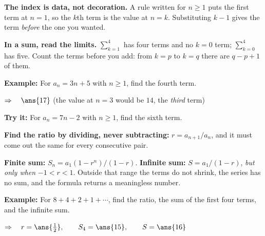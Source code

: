 \documentclass[12pt]{article}
\begin{document}


\begin{formulabox}
\textbf{The index is data, not decoration.} A rule written for $n \ge 1$ puts the first term
at $n = 1$, so the $k$th term is the value at $n = k$. Substituting $k - 1$ gives the term
\emph{before} the one you wanted.\par
\textbf{In a sum, read the limits.} $\sum_{k=1}^{4}$ has four terms and no $k = 0$ term;
$\sum_{k=0}^{4}$ has five. Count the terms before you add: from $k = p$ to $k = q$ there are
$q - p + 1$ of them.
\end{formulabox}

\begin{examplebox}
\textbf{Example:} \quad For $a_n = 3n + 5$ with $n \ge 1$, find the fourth term.

$\Rightarrow\quad \ans{17}$ \quad (the value at $n = 3$ would be $14$, the \emph{third} term)
\end{examplebox}

\begin{tryitbox}
\textbf{Try it:} \quad For $a_n = 7n - 2$ with $n \ge 1$, find the sixth term.\\[2pt]
\end{tryitbox}


\begin{formulabox}
\textbf{Find the ratio by dividing, never subtracting:} $r = a_{n+1} / a_n$, and it must come
out the same for every consecutive pair.\par
\textbf{Finite sum:} $S_n = a_1(1 - r^n)/(1 - r)$. \quad
\textbf{Infinite sum:} $S = a_1/(1 - r)$, \emph{but only when} $-1 < r < 1$. Outside that
range the terms do not shrink, the series has no sum, and the formula returns a meaningless
number.
\end{formulabox}

\begin{examplebox}
\textbf{Example:} \quad For $8 + 4 + 2 + 1 + \cdots$, find the ratio, the sum of the first four terms, and the infinite sum.

$\Rightarrow\quad r = \ans{\tfrac{1}{2}}, \qquad S_4 = \ans{15}, \qquad S = \ans{16}$
\end{examplebox}
\end{document}
